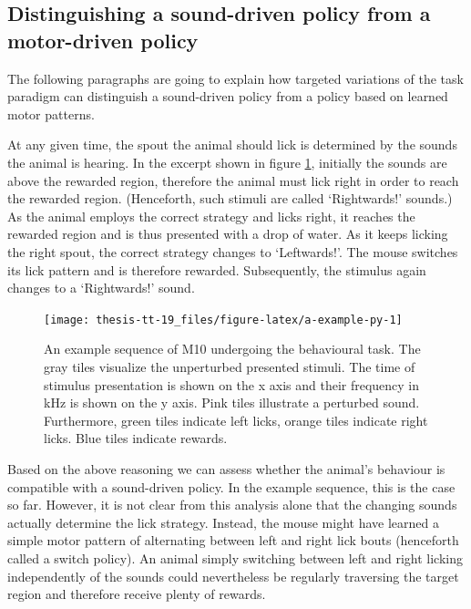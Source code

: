 \documentclass[]{report}
\theoremstyle{definition}
\theoremstyle{definition}
\theoremstyle{definition}
\theoremstyle{remark}
\begin{document}
\hypertarget{distinguishing-a-sound-driven-policy-from-a-motor-driven-policy}{%
\subsection{Distinguishing a sound-driven policy from a motor-driven
policy}\label{distinguishing-a-sound-driven-policy-from-a-motor-driven-policy}}

The following paragraphs are going to explain how targeted variations of
the task paradigm can distinguish a sound-driven policy from a policy
based on learned motor patterns.

At any given time, the spout the animal should lick is determined by the
sounds the animal is hearing. In the excerpt shown in figure
\ref{fig:a-example-py}, initially the sounds are above the rewarded
region, therefore the animal must lick right in order to reach the
rewarded region. (Henceforth, such stimuli are called `Rightwards!'
sounds.) As the animal employs the correct strategy and licks right, it
reaches the rewarded region and is thus presented with a drop of water.
As it keeps licking the right spout, the correct strategy changes to
`Leftwards!'. The mouse switches its lick pattern and is therefore
rewarded. Subsequently, the stimulus again changes to a `Rightwards!'
sound.

\begin{figure}

{\centering \texttt{[image: thesis-tt-19\_files/figure-latex/a-example-py-1]} 

}

\caption{An example sequence of M10 undergoing the behavioural
task. The gray tiles visualize the unperturbed presented stimuli. The
time of stimulus presentation is shown on the x axis and their frequency
in kHz is shown on the y axis. Pink tiles illustrate a perturbed sound.
Furthermore, green tiles indicate left licks, orange tiles indicate
right licks. Blue tiles indicate rewards.}\label{fig:a-example-py}
\end{figure}








Based on the above reasoning we can assess whether the animal's
behaviour is compatible with a sound-driven policy. In the example
sequence, this is the case so far. However, it is not clear from this
analysis alone that the changing sounds actually determine the lick
strategy. Instead, the mouse might have learned a simple motor pattern
of alternating between left and right lick bouts (henceforth called a
switch policy). An animal simply switching between left and right
licking independently of the sounds could nevertheless be regularly
traversing the target region and therefore receive plenty of rewards.
\end{document}
